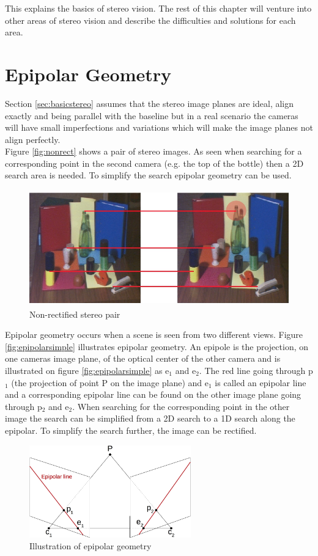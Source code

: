 This explains the basics of stereo vision. The rest of this chapter will venture into other areas of stereo vision and describe the difficulties and solutions for each area.

\section{Epipolar Geometry}
Section \ref{sec:basicstereo} assumes that the stereo image planes are ideal, align exactly and being parallel with the baseline but in a real scenario the cameras will have small imperfections and variations which will make the image planes not align perfectly.\\
 
Figure \vref{fig:nonrect} shows a pair of stereo images. As seen when searching for a corresponding point in the second camera (e.g. the top of the bottle) then a 2D search area is needed. To simplify the search epipolar geometry can be used. \\
\begin{figure}[ht!]
  \centering\includegraphics[height=5cm]{figures/nonrect.jpg}
  \caption{Non-rectified stereo pair\label{fig:nonrect} \cite{Mattoccia2013}}
\end{figure}

Epipolar geometry occurs when a scene is seen from two different views. Figure \vref{fig:epipolarsimple} illustrates epipolar geometry. An epipole is the projection, on one cameras image plane, of the optical center of the other camera and is illustrated on figure \vref{fig:epipolarsimple} as e$_1$ and e$_2$. The red line going through p$_1$ (the projection of point P on the image plane) and e$_1$ is called an epipolar line and a corresponding epipolar line can be found on the other image plane going through p$_2$ and e$_2$. When searching for the corresponding point in the other image the search can be simplified from a 2D search to a 1D search along the epipolar. To simplify the search further, the image can be rectified.\\
\begin{figure}[ht!]
  \centering
  \includegraphics[height=4cm]{figures/epipolarsimple}
  \caption{Illustration of epipolar geometry}
  \label{fig:epipolarsimple}
\end{figure}

